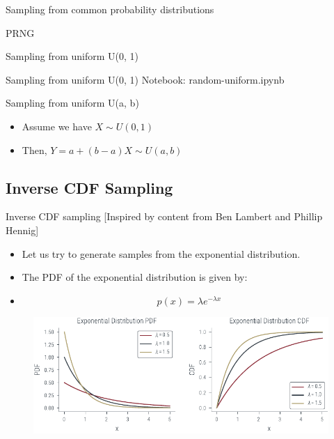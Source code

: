 \documentclass{beamer}
\begin{document}
\begin{section}{Sampling from common probability distributions}
\begin{subsection}{PRNG}
\begin{frame}{Sampling from uniform U(0, 1)}
\end{frame}

\begin{frame}{Sampling from uniform U(0, 1)}
Notebook: random-uniform.ipynb
    
\end{frame}

\begin{frame}{Sampling from uniform U(a, b)}
    \begin{itemize}
        \item Assume we have $X \sim U(0, 1)$
        \item \pause Then, $Y = a + (b - a) X \sim U(a, b)$
    \end{itemize}
    
\end{frame}

\end{subsection}

\subsection{Inverse CDF Sampling}
\begin{frame}{Inverse CDF sampling}
    [Inspired by content from Ben Lambert and Phillip Hennig]
    \begin{itemize}
        \item Let us try to generate samples from the exponential distribution. 
        \item \pause The PDF of the exponential distribution is given by:
        \item \pause \begin{equation}
            p(x) = \lambda e^{-\lambda x}
        \end{equation}
    \end{itemize}

    \begin{figure}
\includegraphics[width=\columnwidth]{../figures/sampling/exp-cdf.pdf}
    \end{figure}
    

\end{frame}
\end{section}
\end{document}
